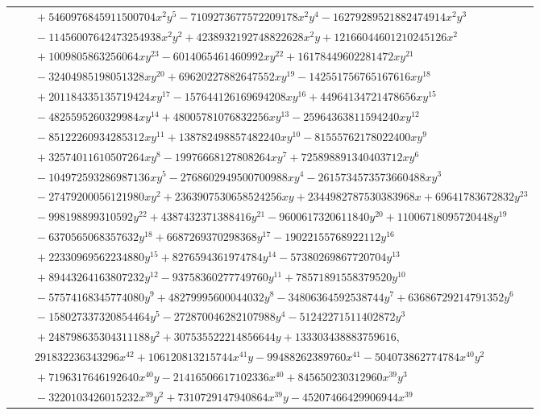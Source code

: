 \documentclass[11pt]{article}
\begin{document}
\begin{longtable}{@{}ll@{}}
 & $\quad +5460976845911500704x^{2}y^{5}-7109273677572209178x^{2}y^{4}-16279289521882474914x^{2}y^{3}$\\
 & $\quad -11456007642473254938x^{2}y^{2}+4238932192748822628x^{2}y+12166044601210245126x^{2}$\\
 & $\quad +1009805863256064xy^{23}-6014065461460992xy^{22}+16178449602281472xy^{21}$\\
 & $\quad -32404985198051328xy^{20}+69620227882647552xy^{19}-142551756765167616xy^{18}$\\
 & $\quad +201184335135719424xy^{17}-157644126169694208xy^{16}+44964134721478656xy^{15}$\\
 & $\quad -4825595260329984xy^{14}+48005781076832256xy^{13}-25964363811594240xy^{12}$\\
 & $\quad -85122260934285312xy^{11}+138782498857482240xy^{10}-81555762178022400xy^{9}$\\
 & $\quad +32574011610507264xy^{8}-19976668127808264xy^{7}+725898891340403712xy^{6}$\\
 & $\quad -104972593286987136xy^{5}-2768602949500700988xy^{4}-2615734573573660488xy^{3}$\\
 & $\quad -27479200056121980xy^{2}+2363907530658524256xy+2344982787530383968x+69641783672832y^{23}$\\
 & $\quad -998198899310592y^{22}+4387432371388416y^{21}-9600617320611840y^{20}+11006718095720448y^{19}$\\
 & $\quad -6370565068357632y^{18}+6687269370298368y^{17}-19022155768922112y^{16}$\\
 & $\quad +22330969562234880y^{15}+8276594361974784y^{14}-57380269867720704y^{13}$\\
 & $\quad +89443264163807232y^{12}-93758360277749760y^{11}+78571891558379520y^{10}$\\
 & $\quad -57574168345774080y^{9}+48279995600044032y^{8}-34806364592538744y^{7}+63686729214791352y^{6}$\\
 & $\quad -158027337320854464y^{5}-272870046282107988y^{4}-51242271511402872y^{3}$\\
 & $\quad +248798635304311188y^{2}+307535522214856644y+133303438883759616,$\\
 & $\quad 291832236343296x^{42}+106120813215744x^{41}y-99488262389760x^{41}-504073862774784x^{40}y^{2}$\\
 & $\quad +7196317646192640x^{40}y-21416506617102336x^{40}+845650230312960x^{39}y^{3}$\\
 & $\quad -3220103426015232x^{39}y^{2}+7310729147940864x^{39}y-45207466429906944x^{39}$\\

\end{longtable}
\end{document}
